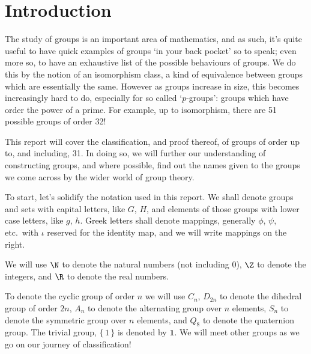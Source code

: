 \begin{table}
\begin{center}
    \end{center}
\end{table}


\section{Introduction}
The study of groups is an important area of mathematics, and as such, it's quite useful to have quick examples of groups
`in your back pocket' so to speak; even more so, to have an exhaustive list of the possible behaviours of groups.
We do this by the notion of an isomorphism class, a kind of equivalence between groups which are essentially the same.
However as groups increase in size, this becomes increasingly hard to do, especially for so called `\(p\)-groups':
groups which have order the power of a prime.
For example, up to isomorphism, there are 51 possible groups of order 32!

This report will cover the classification, and proof thereof, of groups of order up to, and including, 31.
In doing so, we will further our understanding of constructing groups, and where possible, find out the names given to
the groups we come across by the wider world of group theory.

To start, let's solidify the notation used in this report.
We shall denote groups and sets with capital letters, like \(G\), \(H\), and elements of those groups with lower case
letters, like \(g\), \(h\).
Greek letters shall denote mappings, generally \(\phi\), \(\psi\), etc.\ with \(\iota\) reserved for the identity map,
and we will write mappings on the right.

We will use \(\N\) to denote the natural numbers (not including 0), \(\Z\) to denote the integers, and \(\R\) to denote
the real numbers.

To denote the cyclic group of order \(n\) we will use \(C_n\), \(D_{2n}\) to denote the dihedral group of order \(2n\),
\(A_n\) to denote the alternating group over \(n\) elements, \(S_n\) to denote the symmetric group over \(n\)
elements, and \(Q_8\) to denote the quaternion group.
The trivial group, \(\{\, 1\, \}\) is denoted by \(\bm{1}\).
We will meet other groups as we go on our journey of classification!

